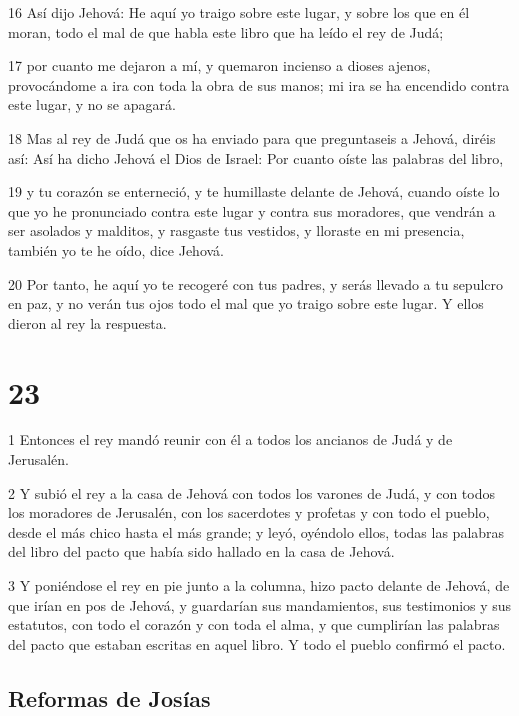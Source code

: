 \par 16 Así dijo Jehová: He aquí yo traigo sobre este lugar, y sobre los que en él moran, todo el mal de que habla este libro que ha leído el rey de Judá;
\par 17 por cuanto me dejaron a mí, y quemaron incienso a dioses ajenos, provocándome a ira con toda la obra de sus manos; mi ira se ha encendido contra este lugar, y no se apagará.
\par 18 Mas al rey de Judá que os ha enviado para que preguntaseis a Jehová, diréis así: Así ha dicho Jehová el Dios de Israel: Por cuanto oíste las palabras del libro,
\par 19 y tu corazón se enterneció, y te humillaste delante de Jehová, cuando oíste lo que yo he pronunciado contra este lugar y contra sus moradores, que vendrán a ser asolados y malditos, y rasgaste tus vestidos, y lloraste en mi presencia, también yo te he oído, dice Jehová.
\par 20 Por tanto, he aquí yo te recogeré con tus padres, y serás llevado a tu sepulcro en paz, y no verán tus ojos todo el mal que yo traigo sobre este lugar. Y ellos dieron al rey la respuesta.

\chapter{23}

\par 1 Entonces el rey mandó reunir con él a todos los ancianos de Judá y de Jerusalén.
\par 2 Y subió el rey a la casa de Jehová con todos los varones de Judá, y con todos los moradores de Jerusalén, con los sacerdotes y profetas y con todo el pueblo, desde el más chico hasta el más grande; y leyó, oyéndolo ellos, todas las palabras del libro del pacto que había sido hallado en la casa de Jehová.
\par 3 Y poniéndose el rey en pie junto a la columna, hizo pacto delante de Jehová, de que irían en pos de Jehová, y guardarían sus mandamientos, sus testimonios y sus estatutos, con todo el corazón y con toda el alma, y que cumplirían las palabras del pacto que estaban escritas en aquel libro. Y todo el pueblo confirmó el pacto.

\section*{Reformas de Josías}

